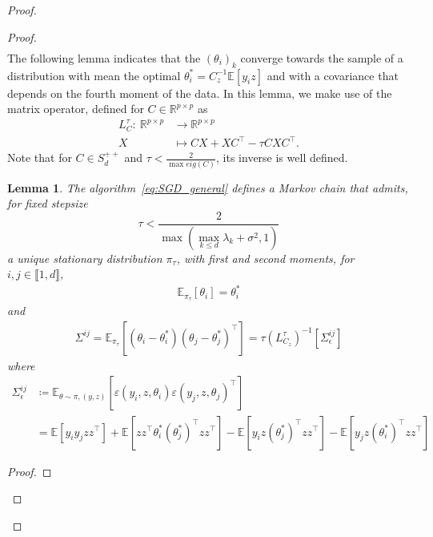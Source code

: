 \documentclass[11pt]{article}
\newtheorem{lem}{Lemma}
\newcommand{\eqdef}{\coloneqq}
\newcommand{\RR}{\mathbb{R}}
\newcommand{\EE}{\mathbb{E}}
\begin{document}
\begin{proof}
\begin{proof}
\begin{align}
\end{align}
The following lemma indicates that the $(\theta_i)_k$ converge towards the sample of a distribution with mean the optimal $\theta_i^* = C_z^{-1} \mathbb{E}[y_i z]$ and with a covariance that depends on the fourth moment of the data. In this lemma, we make use of the matrix operator, defined for $C \in \RR^{p \times p}$ as
\begin{equation} \label{eq:lyap_extend}
\begin{split}
        L^\tau_C :  \  \RR^{p\times p} &\to  \RR^{p\times p} \\
     X &\mapsto  CX + XC^\top - \tau C X C^\top.
\end{split}
\end{equation}
Note that for $C \in S^{++}_d$ and $\tau < \frac{2}{\max eig(C)}$, its inverse is well defined. 
\begin{lem} \label{lem:SGD_1}
The algorithm~\eqref{eq:SGD_general} defines a Markov chain that admits, for fixed stepsize $$\tau < \frac{2}{\max\left( \max_{k\leq d}{\lambda_k} + \sigma^2, 1 \right) }$$ a unique stationary distribution $\pi_\tau$, with first and second moments, for 
$i,j \in \llbracket 1, d \rrbracket$,
\begin{align*}
\EE_{\pi_\tau}[\theta_i]  = \theta_i^* 
\end{align*}
and
\begin{align} \label{eq:sigma_Linv}
\Sigma^{ij} = \EE_{\pi_\tau}\left[(\theta_i -  \theta_i^*)(\theta_j - \theta_j^*)^\top\right] = \tau (L_{ C_z}^\tau)^{-1} [\Sigma_\epsilon^{ij}] 
\end{align}
where
\begin{align}
\Sigma_\epsilon^{ij} &\eqdef \EE_{\theta \sim \pi, (y, z)} [  \varepsilon(y_i,z,\theta_i) \varepsilon(y_j, z, \theta_j)^\top ] \\
&= \EE[y_i y_j z z^\top] + \EE[z z^\top \theta_i^*(\theta_j^*)^\top z z^\top] - \EE[y_i z (\theta_j^*)^\top z z^\top] - \EE[y_j z (\theta_i^*)^\top z z^\top] \label{eq:sigma_eps_lemma}
\end{align}
\end{lem}
\begin{proof}

\end{proof}
\end{proof}
\end{proof}
\end{document}

